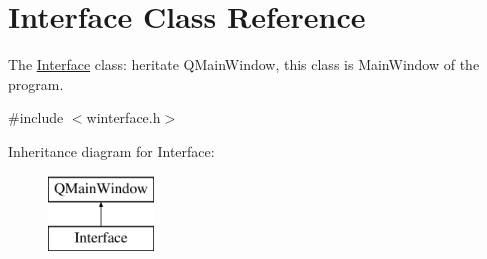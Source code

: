 \hypertarget{class_interface}{}\section{Interface Class Reference}
\label{class_interface}


The \hyperlink{class_interface}{Interface} class\+: heritate Q\+Main\+Window, this class is Main\+Window of the program.  




{\ttfamily \#include $<$winterface.\+h$>$}

Inheritance diagram for Interface\+:\begin{figure}[H]
\begin{center}
\leavevmode
\includegraphics[height=2.000000cm]{class_interface}
\end{center}
\end{figure}
